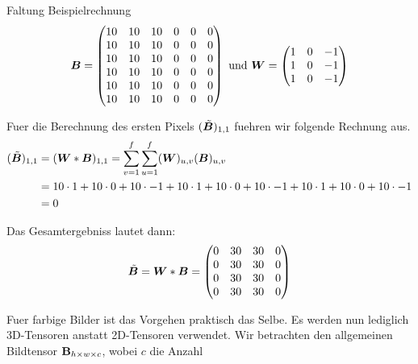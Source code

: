 \begin{examplebox}{Faltung Beispielrechnung}
  \begin{equation*}
    \bm{B} =
    \begin{pmatrix}
      10 & 10 & 10 & 0 & 0 & 0 \\
      10 & 10 & 10 & 0 & 0 & 0 \\
      10 & 10 & 10 & 0 & 0 & 0 \\
      10 & 10 & 10 & 0 & 0 & 0 \\
      10 & 10 & 10 & 0 & 0 & 0 \\
      10 & 10 & 10 & 0 & 0 & 0 \\
    \end{pmatrix}
    \text{ und } \bm{W} =
    \begin{pmatrix}
      1 & 0 & -1 \\
      1 & 0 & -1 \\
      1 & 0 & -1 \\
    \end{pmatrix}
  \end{equation*}

  Fuer die Berechnung des ersten Pixels $(\tilde{\bm{B}})_{1,1}$ fuehren wir
  folgende Rechnung aus.
  \begin{align*}
    (\tilde{\bm{B}})_{1,1} &= (\bm{W} * \bm{B})_{1,1} = \sum_{v=1}^{f} \sum_{u=1}^{f} (\bm{W})_{u,v} (\bm{B})_{u,v} \\
                            &= 10 \cdot 1 + 10 \cdot 0 + 10 \cdot -1 + 10 \cdot 1 + 10 \cdot 0 + 10 \cdot -1 + 10 \cdot 1 + 10 \cdot 0 + 10 \cdot -1 \\
                            &= 0
  \end{align*}

  Das Gesamtergebniss lautet dann:
  \begin{equation*}
    \tilde{\bm{B}} = \bm{W} * \bm{B} =
    \begin{pmatrix}
      0 & 30 & 30 & 0 \\
      0 & 30 & 30 & 0 \\
      0 & 30 & 30 & 0 \\
      0 & 30 & 30 & 0 \\
    \end{pmatrix}
  \end{equation*}
\end{examplebox}
\para{}
Fuer farbige Bilder ist das Vorgehen praktisch das Selbe. Es werden nun
lediglich 3D-Tensoren anstatt 2D-Tensoren verwendet. Wir betrachten den
allgemeinen Bildtensor $\mathbf{B}_{h \times w \times c}$, wobei $c$ die Anzahl
